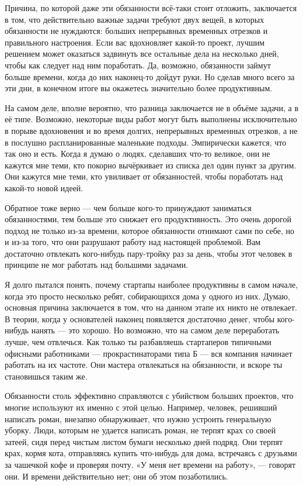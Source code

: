 \documentclass[ebook,12pt,oneside,openany]{memoir}
\begin{document}
Причина, по которой даже эти обязанности всё-таки стоит отложить,
заключается в том, что действительно важные задачи требуют двух вещей,
в которых обязанности не нуждаются: больших непрерывных временных
отрезков и правильного настроения. Если вас вдохновляет какой-то
проект, лучшим решением может оказаться задвинуть все остальные дела
на несколько дней, чтобы как следует над ним поработать. Да, возможно,
обязанности займут больше времени, когда до них наконец-то дойдут
руки. Но сделав много всего за эти дни, в конечном итоге вы окажетесь
значительно более продуктивным.

На самом деле, вполне вероятно, что разница заключается не в объёме
задачи, а в её типе. Возможно, некоторые виды работ могут быть
выполнены исключительно в порыве вдохновения и во время долгих,
непрерывных временных отрезков, а не в послушно распланированные
маленькие подходы. Эмпирически кажется, что так оно и есть. Когда я
думаю о людях, сделавших что-то великое, они не кажутся мне теми, кто
покорно вычёркивает из списка дел один пункт за другим. Они кажутся
мне теми, кто увиливает от обязанностей, чтобы поработать над какой-то
новой идеей.

Обратное тоже верно — чем больше кого-то принуждают заниматься
обязанностями, тем больше это снижает его продуктивность. Это очень
дорогой подход не только из-за времени, которое обязанности отнимают
сами по себе, но и из-за того, что они разрушают работу над настоящей
проблемой. Вам достаточно отвлекать кого-нибудь пару-тройку раз за
день, чтобы этот человек в принципе не мог работать над большими
задачами.

Я долго пытался понять, почему стартапы наиболее продуктивны в самом
начале, когда это просто несколько ребят, собирающихся дома у одного
из них. Думаю, основная причина заключается в том, что на данном этапе
их никто не отвлекает. В теории, когда у основателей наконец
появляется достаточно денег, чтобы кого-нибудь нанять — это хорошо. Но
возможно, что на самом деле переработать лучше, чем отвлечься. Как
только ты разбавляешь стартаперов типичными офисными работниками —
прокрастинаторами типа Б — вся компания начинает работать на их
частоте. Они мастера отвлекаться на обязанности, и вскоре ты
становишься таким же.

Обязанности столь эффективно справляются с убийством больших проектов,
что многие используют их именно с этой целью. Например, человек,
решивший написать роман, внезапно обнаруживает, что нужно устроить
генеральную уборку. Люди, которым не удается написать роман, не терпят
крах со своей затеей, сидя перед чистым листом бумаги несколько дней
подряд. Они терпят крах, кормя кота, отправляясь купить что-нибудь для
дома, встречаясь с друзьями за чашечкой кофе и проверяя почту. «У меня
нет времени на работу», — говорят они. И времени действительно нет;
они об этом позаботились.
\end{document}
